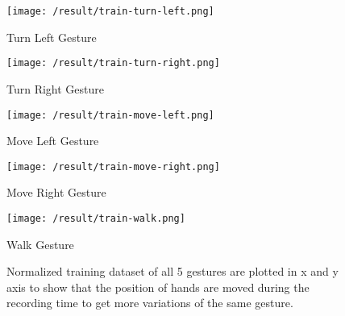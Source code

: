 \begin{figure}
	\begin{minipage}
		{.5 
		\textwidth}
		\texttt{[image: /result/train-turn-left.png]} \caption*{Turn Left Gesture} 
	\end{minipage}
	\begin{minipage}
		{.5 
		\textwidth} 
		\texttt{[image: /result/train-turn-right.png]} \caption*{Turn Right Gesture} 
	\end{minipage}
	\begin{minipage}
		{.5 
		\textwidth} 
		\texttt{[image: /result/train-move-left.png]} \caption*{Move Left Gesture} 
	\end{minipage}
	\begin{minipage}
		{.5 
		\textwidth} 
		\texttt{[image: /result/train-move-right.png]} \caption*{Move Right Gesture} 
	\end{minipage}
	\begin{minipage}
		{.5 
		\textwidth}
		\texttt{[image: /result/train-walk.png]} \caption*{Walk Gesture} 
	\end{minipage}
	\caption{Normalized training dataset of all 5 gestures are plotted in x and y axis to show that the position of hands are moved during the recording time to get more variations of the same gesture.} \label{pl:ges:pos} 
\end{figure}

